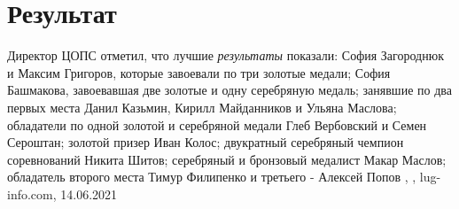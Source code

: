  
 
 
 
 
\chapter{Результат}

Директор ЦОПС отметил, что лучшие \emph{результаты} показали: София Загороднюк и
Максим Григоров, которые завоевали по три золотые медали; София Башмакова,
завоевавшая две золотые и одну серебряную медаль; занявшие по два первых места
Данил Казьмин, Кирилл Майданников и Ульяна Маслова; обладатели по одной золотой
и серебряной медали Глеб Вербовский и Семен Сероштан; золотой призер Иван
Колос; двукратный серебряный чемпион соревнований Никита Шитов; серебряный и
бронзовый медалист Макар Маслов; обладатель второго места Тимур Филипенко и
третьего - Алексей Попов
, 
, lug-info.com, 14.06.2021


